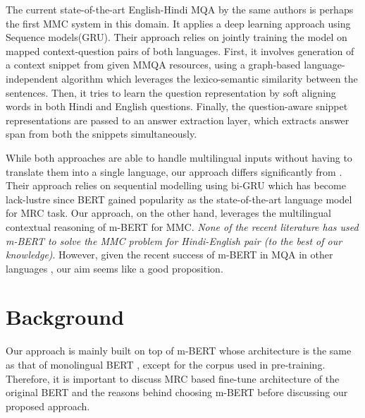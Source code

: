 \documentclass[acmsmall]{acmart}
\begin{document}
\par The current state-of-the-art English-Hindi MQA \cite{latestMQA} by the same authors is perhaps the first MMC system in this domain. It applies a deep learning approach using Sequence models(GRU). Their approach relies on jointly training the model on mapped context-question pairs of both languages.
First, it involves generation of a context snippet from given MMQA resources, using a graph-based language-independent algorithm which leverages the lexico-semantic similarity between the sentences. Then, it tries to learn the question representation by soft aligning words in both Hindi and English questions. Finally, the question-aware snippet representations are passed to an answer extraction layer, which extracts answer span from both the snippets simultaneously. 
\par While both approaches are able to handle multilingual inputs without having to
translate them into a single language, our approach differs significantly from \cite{latestMQA}. Their approach relies on sequential modelling using bi-GRU \cite{bi-GRU} which has become lack-lustre since BERT gained popularity as the state-of-the-art language model for MRC task. Our approach, on the other hand, leverages the multilingual contextual reasoning of m-BERT for MMC. \textit{None of the recent literature has used m-BERT to solve the MMC problem for Hindi-English pair (to the best of our knowledge)}. However, given the recent success of m-BERT in MQA in other languages \cite{liu-etal-2019-xqa}, our aim seems like a good proposition.




\section{Background}
\par Our approach is mainly built on top of m-BERT whose architecture is the same as that of monolingual BERT \cite{bert}, except for the corpus used in pre-training. Therefore, it is important to discuss MRC based fine-tune architecture of the original BERT and the reasons behind choosing m-BERT before discussing our proposed approach.  
\end{document}
